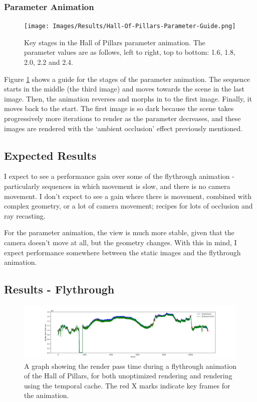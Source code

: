 \subsubsection{Parameter Animation}

\begin{figure}[ht]
	\centering
	\texttt{[image: Images/Results/Hall-Of-Pillars-Parameter-Guide.png]}
	\caption{Key stages in the Hall of Pillars parameter animation. The parameter values are as follows, left to right, top to bottom: 1.6, 1.8, 2.0, 2.2 and 2.4.}
	\label{figure:hall-of-pillars-parameter-guide}
\end{figure}

Figure \ref{figure:hall-of-pillars-parameter-guide} shows a guide for the stages of the parameter animation. The sequence starts in the middle (the third image) and moves towards the scene in the last image. Then, the animation reverses and morphs in to the first image. Finally, it moves back to the start. The first image is so dark because the scene takes progressively more iterations to render as the parameter decreases, and these images are rendered with the `ambient occlusion' effect previously mentioned.

\subsection{Expected Results}

I expect to see a performance gain over some of the flythrough animation - particularly sequences in which movement is slow, and there is no camera movement. I don't expect to see a gain where there is movement, combined with complex geometry, or a lot of camera movement; recipes for lots of occlusion and ray recasting.\newline

For the parameter animation, the view is much more stable, given that the camera doesn't move at all, but the geometry changes. With this in mind, I expect performance somewhere between the static images and the flythrough animation.

\subsection{Results - Flythrough}

\begin{figure}[ht]
	\centering
	\includegraphics[width=\linewidth, frame]{Images/Results/Hall-Of-Pillars-Flythrough-Animation.png}
	\caption{A graph showing the render pass time during a flythrough animation of the Hall of Pillars, for both unoptimized rendering and rendering using the temporal cache. The red X marks indicate key frames for the animation.}
	\label{figure:hall-of-pillars-flythrough-animation}
\end{figure}

